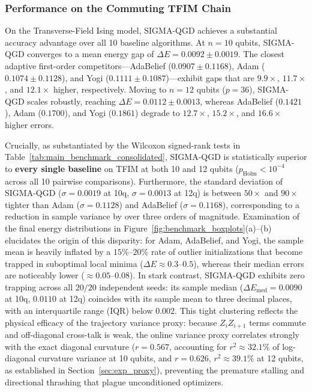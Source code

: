 \documentclass[11pt,a4paper]{article}
\begin{document}
\subsubsection{Performance on the Commuting TFIM Chain}
On the Transverse-Field Ising model, SIGMA-QGD achieves a substantial accuracy advantage over all 10 baseline algorithms. At $n=10$ qubits, SIGMA-QGD converges to a mean energy gap of $\Delta E = 0.0092 \pm 0.0019$. The closest adaptive first-order competitors—AdaBelief ($0.0907 \pm 0.1168$), Adam ($0.1074 \pm 0.1128$), and Yogi ($0.1111 \pm 0.1087$)—exhibit gaps that are $9.9\times$, $11.7\times$, and $12.1\times$ higher, respectively. Moving to $n=12$ qubits ($p=36$), SIGMA-QGD scales robustly, reaching $\Delta E = 0.0112 \pm 0.0013$, whereas AdaBelief ($0.1421$), Adam ($0.1700$), and Yogi ($0.1861$) degrade to $12.7\times$, $15.2\times$, and $16.6\times$ higher errors.

Crucially, as substantiated by the Wilcoxon signed-rank tests in Table~\ref{tab:main_benchmark_consolidated}, SIGMA-QGD is statistically superior to \textbf{every single baseline} on TFIM at both 10 and 12 qubits ($p_{\text{Holm}} < 10^{-4}$ across all 10 pairwise comparisons). Furthermore, the standard deviation of SIGMA-QGD ($\sigma = 0.0019$ at 10q, $\sigma = 0.0013$ at 12q) is between $50\times$ and $90\times$ tighter than Adam ($\sigma = 0.1128$) and AdaBelief ($\sigma = 0.1168$), corresponding to a reduction in sample variance by over three orders of magnitude. Examination of the final energy distributions in Figure~\ref{fig:benchmark_boxplots}(a)--(b) elucidates the origin of this disparity: for Adam, AdaBelief, and Yogi, the sample mean is heavily inflated by a $15\%\text{--}20\%$ rate of outlier initializations that become trapped in suboptimal local minima ($\Delta E \approx 0.3\text{--}0.5$), whereas their median errors are noticeably lower ($\approx 0.05\text{--}0.08$). In stark contrast, SIGMA-QGD exhibits zero trapping across all $20/20$ independent seeds: its sample median ($\Delta E_{\text{med}} = 0.0090$ at 10q, $0.0110$ at 12q) coincides with its sample mean to three decimal places, with an interquartile range (IQR) below $0.002$. This tight clustering reflects the physical efficacy of the trajectory variance proxy: because $Z_i Z_{i+1}$ terms commute and off-diagonal cross-talk is weak, the online variance proxy correlates strongly with the exact diagonal curvature ($r = 0.567$, accounting for $r^2 \approx 32.1\%$ of log-diagonal curvature variance at 10 qubits, and $r = 0.626$, $r^2 \approx 39.1\%$ at 12 qubits, as established in Section~\ref{sec:exp_proxy}), preventing the premature stalling and directional thrashing that plague unconditioned optimizers.
\end{document}
